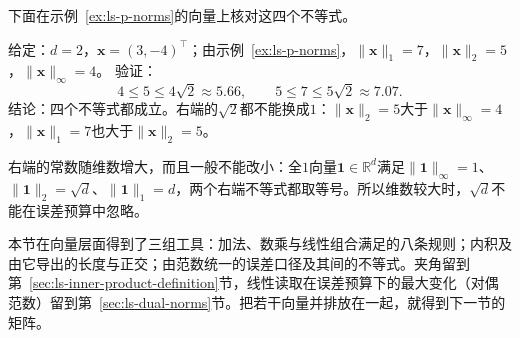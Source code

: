 下面在示例~\ref{ex:ls-p-norms}的向量上核对这四个不等式。
\begin{example}[范数比较的数值核对]
\label{ex:ls-norm-comparison-check}
给定：$d=2$，$\bm x=(3,-4)^\top$；由示例~\ref{ex:ls-p-norms}，$\lVert\bm x\rVert_1=7$，$\lVert\bm x\rVert_2=5$，$\lVert\bm x\rVert_\infty=4$。
验证：
\[
 4\leq5\leq4\sqrt2\approx5.66,\qquad
 5\leq7\leq5\sqrt2\approx7.07.
\]
结论：四个不等式都成立。右端的$\sqrt2$都不能换成$1$：$\lVert\bm x\rVert_2=5$大于$\lVert\bm x\rVert_\infty=4$，$\lVert\bm x\rVert_1=7$也大于$\lVert\bm x\rVert_2=5$。
\end{example}
右端的常数随维数增大，而且一般不能改小：全$1$向量$\bm 1\in\mathbb R^d$满足$\lVert\bm 1\rVert_\infty=1$、$\lVert\bm 1\rVert_2=\sqrt d$、$\lVert\bm 1\rVert_1=d$，两个右端不等式都取等号。所以维数较大时，$\sqrt d$不能在误差预算中忽略。

本节在向量层面得到了三组工具：加法、数乘与线性组合满足的八条规则；内积及由它导出的长度与正交；由范数统一的误差口径及其间的不等式。夹角留到第~\ref{sec:ls-inner-product-definition}节，线性读取在误差预算下的最大变化（对偶范数）留到第~\ref{sec:ls-dual-norms}节。把若干向量并排放在一起，就得到下一节的矩阵。
